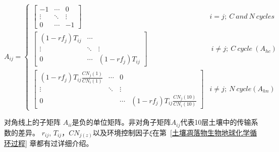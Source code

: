 \begin{equation}
A_{i j}=\left\{\begin{array}{ccc}{\left[\begin{array}{ccc}-1 & \cdots & 0 \\ \vdots & \ddots & \vdots \\ 0 & \cdots & -1\end{array}\right]}   &i=j;\ C\ and\ N\ cycles \\
 {\left[\begin{array}{ccc}\left(1-r f_{j}\right) T_{i j} & \cdots & \\ \vdots & \ddots & \vdots \\ 0 & \cdots & \left(1-r f_{j}\right) T_{i j}\end{array}\right]}   &\ i\neq j;\ C\ cycle\ \left(A_{hc}\right)\  \\ 
 {\left[\begin{array}{cccc}\left(1-r f_{j}\right) T_{i j} \frac{C N_{j}(1)}{C N_{i}(1)} & \cdots & 0 \\ \vdots & \ddots & \vdots \\ 0 & & \cdots & \left(1-r f_{j}\right) T_{i j} \frac{C N_{j}(10)}{C N_{i}(10)}\end{array}\right]}& i\neq j;\ N\ cycle\left(A_{hn}\right) \end{array}\right.
\end{equation}


对角线上的子矩阵 $A_{ii}$是负的单位矩阵。非对角子矩阵$A_{ij}$代表10层土壤中的传输系数的差异。
$r_{ij}$, $T_{ij}$，$CN_{j(z)}$以及环境控制因子$\xi$在第~\ref{土壤凋落物生物地球化学循环过程} 章都有过详细介绍。

